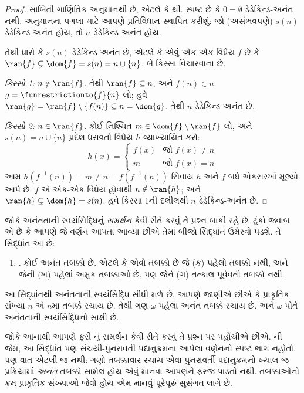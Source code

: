 \begin{proof}
સાબિતી ગાણિતિક અનુમાનથી છે, એટલે કે
થી.
સ્પષ્ટ છે કે $0
= \emptyset$ ડેડેકિન્ડ-અનંત નથી. અનુમાનના પગલા માટે આપણે
પ્રતિવિધાન સ્થાપિત કરીશું: જો (અસંભવપણે) $s(n)$ ડેડેકિન્ડ-અનંત
હોય, તો $n$ ડેડેકિન્ડ-અનંત હોય.

તેથી ધારો કે $s(n)$ ડેડેકિન્ડ-અનંત છે, એટલે કે એવું એક-એક વિધેય
$f$ છે કે $\ran{f}\subsetneq \dom{f} = s(n) = n \cup
\{n\}$. બે કિસ્સા વિચારવાના છે.

\emph{કિસ્સો 1: $n \notin \ran{f}$.} તેથી $\ran{f} \subseteq n$,
અને $f(n) \in n$. $g = \funrestrictionto{f}{n}$ લો; હવે $\ran{g} =
\ran{f} \setminus \{f(n)\} \subsetneq n = \dom{g}$.
તેથી $n$ ડેડેકિન્ડ-અનંત છે.

\emph{કિસ્સો 2: $n \in \ran{f}$.} કોઈ નિશ્ચિત
$m \in \dom{f} \setminus \ran{f}$ લો, અને
$s(n) = n \cup \{n\}$ પ્રદેશ ધરાવતો વિધેય $h$ વ્યાખ્યાયિત કરો:
\[
h(x) =
	\begin{cases}
		f(x) & \text{જો }f(x) \neq n\\
		m & \text{જો }f(x)=n
	\end{cases}
\]
આમ $h(f^{-1}(n)) = m
\neq n = f(f^{-1}(n))$ સિવાય $h$ અને $f$ બધે એકસરખાં મૂલ્યો
આપે છે. $f$ એ એક-એક વિધેય હોવાથી $n \notin
\ran{h}$; અને $\ran{h} \subsetneq \dom{h} = s(n)$.
હવે કિસ્સા 1ની દલીલથી $n$ ડેડેકિન્ડ-અનંત છે.
\end{proof}

જોકે અનંતતાની સ્વયંસિદ્ધિનું \emph{સમર્થન} કેવી રીતે કરવું તે
પ્રશ્ન બાકી રહે છે. ટૂંકો જવાબ એ છે કે આપણે જે વર્ણન આપતા આવ્યા
છીએ તેમાં બીજો સિદ્ધાંત ઉમેરવો પડશે. તે સિદ્ધાંત આ છે:
\begin{enumerate}
	\item[] \stagesinf. કોઈ અનંત તબક્કો છે. એટલે કે એવો તબક્કો છે
જે (ક) પહેલો તબક્કો નથી, અને જેની (ખ) પહેલાં અમુક તબક્કાઓ છે,
પણ જેને (ગ) તત્કાલ પૂર્વવર્તી તબક્કો નથી.
\end{enumerate}
આ સિદ્ધાંતથી અનંતતાની સ્વયંસિદ્ધિ સીધી મળે છે. આપણે જાણીએ છીએ
કે પ્રાકૃતિક સંખ્યા $n$ એ $n$મા તબક્કે રચાય છે. તેથી ગણ
$\omega$ પહેલા અનંત તબક્કે રચાય છે. અને $\omega$ પોતે
અનંતતાની સ્વયંસિદ્ધિનો સાક્ષી છે.

જોકે આનાથી આપણે ફરી \stagesinf{}નું સમર્થન કેવી રીતે કરવું તે
પ્રશ્ન પર પહોંચીએ છીએ. \stagessucc{}ની જેમ, આ સિદ્ધાંત પણ
સંચયી-પુનરાવર્તી પદાનુક્રમના આપેલા વર્ણનનો સ્પષ્ટ ભાગ નહોતો.
પણ વાત એટલી જ નથી: ગણો તબક્કાવાર રચાય એવા પુનરાવર્તી
પદાનુક્રમનો ખ્યાલ જ પ્રક્રિયામાં \emph{અનંત} તબક્કો સામેલ હોય
એવું માનવા આપણને ફરજ પાડતો નથી. તબક્કાઓનો ક્રમ પ્રાકૃતિક
સંખ્યાઓ જેવો હોય એમ માનવું પૂરેપૂરું સુસંગત લાગે છે.

